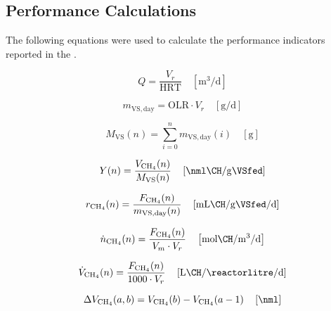 \subsection{Performance Calculations}
\label{subsec:performance_calculations}

The following equations were used to calculate the performance indicators reported in the .

\begin{equation}
    Q = \frac{V_r}{\mathrm{HRT}} \quad \left[\unit{\cubic\metre\per\day}\right]
    \label{eq:Q}
\end{equation}

\begin{equation}
    m_{\mathrm{VS,day}} = \mathrm{OLR} \cdot V_r \quad \left[\unit{\gram\per\day}\right]
    \label{eq:mVS_day}
\end{equation}

\begin{equation}
    M_{\mathrm{VS}}(n) = \sum_{i=0}^{n} m_{\mathrm{VS,day}}(i) \quad \left[\unit{\gram}\right]
    \label{eq:cumVS}
\end{equation}

\begin{equation}
    Y(n) = \frac{V_{\mathrm{CH_4}}(n)}{M_{\mathrm{VS}}(n)} \quad \left[\unit{\nml\CH\per\gram\VSfed}\right]
    \label{eq:cumYield}
\end{equation}

\begin{equation}
    r_{\mathrm{CH_4}}(n) = \frac{F_{\mathrm{CH_4}}(n)}{m_{\mathrm{VS,day}}(n)} \quad \left[\unit{\milli\litre\CH\per\gram\VSfed\per\day}\right]
    \label{eq:dailyRate}
\end{equation}

\begin{equation}
    \dot{n}_{\mathrm{CH_4}}(n) = \frac{F_{\mathrm{CH_4}}(n)}{V_m \cdot V_r} \quad \left[\unit{\mol\CH\per\cubic\metre\per\day}\right]
    \label{eq:molRate}
\end{equation}

\begin{equation}
    \dot{V}_{\mathrm{CH_4}}(n) = \frac{F_{\mathrm{CH_4}}(n)}{1000 \cdot V_r} \quad \left[\unit{\litre\CH\per\reactorlitre\per\day}\right]
    \label{eq:volRate}
\end{equation}

\begin{equation}
    \Delta V_{\mathrm{CH_4}}(a,b) = V_{\mathrm{CH_4}}(b) - V_{\mathrm{CH_4}}(a-1) \quad \left[\unit{\nml}\right]
    \label{eq:deltaVCH4}
\end{equation}

